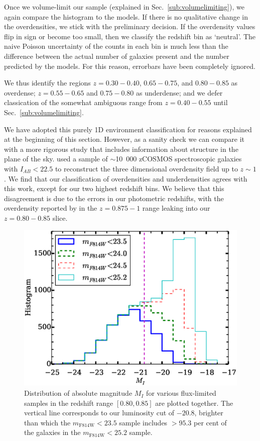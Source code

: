 \documentclass[twocolumn,useAMS,usenatbib]{mn2e}
\begin{document}
Once we volume-limit our sample (explained in Sec.~\ref{sub:volumelimiting}), we again compare the histogram to the models.
If there is no qualitative change in the overdensities, we stick with the preliminary decision. If the overdensity values
flip in sign or become too small, then we classify the redshift bin as `neutral'.
The naive Poisson uncertainty of the counts
in each bin is much less than the difference between the actual number of galaxies present
and the number predicted by the models. For this reason, errorbars have been completely ignored.

We thus identify the regions $z=0.30-0.40$, $0.65-0.75$, and
$0.80-0.85$ as overdense; $z=0.55-0.65$ and $0.75-0.80$ as underdense;
and we defer classication of the somewhat ambiguous range from
$z=0.40-0.55$ until Sec.~\ref{sub:volumelimiting}. 

We have adopted this purely 1D environment classification for reasons
explained at the beginning of this section. However, as a sanity check
we can compare it with a more rigorous study that includes information
about structure in the plane of the sky.  
 \cite{Kovac_Density10k} used a sample of $\sim$10~000 zCOSMOS
 spectroscopic galaxies with $I_{AB}<22.5$ to reconstruct the three dimensional overdensity field up to $z\sim 1$.
We find that our classification of overdensities and underdensities
agrees with this work, except for our two highest redshift bins.
We believe that this disagreement is due to the errors in our
photometric redshifts, with the overdensity reported by
\cite{Kovac_Density10k} in the $z=0.875-1$ range 
leaking into our $z=0.80-0.85$ slice.

\begin{figure}
  \centering
   \includegraphics[width=\columnwidth]{MAG_histograms}
   \caption{Distribution of absolute magnitude $M_I$ for various
     flux-limited samples in the redshift range $[0.80, 0.85]$ are plotted together. The vertical line
     corresponds to our luminosity cut of $-20.8$, brighter than which
     the $m_\text{F814W}<23.5$ sample includes $>95.3$ per cent of the
     galaxies in the $m_\text{F814W}<25.2$ sample.
   }
   \label{fig:MIhist}
 \end{figure}
\end{document}
